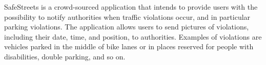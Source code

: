 SafeStreets is a crowd-sourced application that intends to provide users with the possibility to notify authorities when traffic violations occur, and in particular parking violations. The application allows users to send pictures of violations, including their date, time, and position, to authorities. Examples of violations are vehicles parked in the middle of bike lanes or in places reserved for people with disabilities, double parking, and so on.